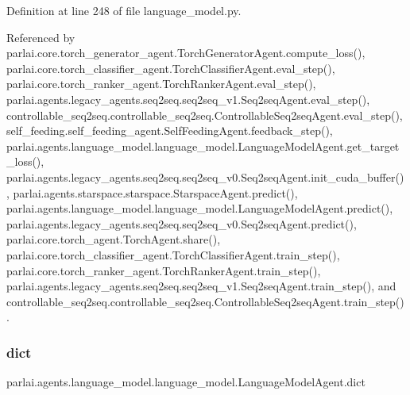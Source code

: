 Definition at line 248 of file language\+\_\+model.\+py.



Referenced by parlai.\+core.\+torch\+\_\+generator\+\_\+agent.\+Torch\+Generator\+Agent.\+compute\+\_\+loss(), parlai.\+core.\+torch\+\_\+classifier\+\_\+agent.\+Torch\+Classifier\+Agent.\+eval\+\_\+step(), parlai.\+core.\+torch\+\_\+ranker\+\_\+agent.\+Torch\+Ranker\+Agent.\+eval\+\_\+step(), parlai.\+agents.\+legacy\+\_\+agents.\+seq2seq.\+seq2seq\+\_\+v1.\+Seq2seq\+Agent.\+eval\+\_\+step(), controllable\+\_\+seq2seq.\+controllable\+\_\+seq2seq.\+Controllable\+Seq2seq\+Agent.\+eval\+\_\+step(), self\+\_\+feeding.\+self\+\_\+feeding\+\_\+agent.\+Self\+Feeding\+Agent.\+feedback\+\_\+step(), parlai.\+agents.\+language\+\_\+model.\+language\+\_\+model.\+Language\+Model\+Agent.\+get\+\_\+target\+\_\+loss(), parlai.\+agents.\+legacy\+\_\+agents.\+seq2seq.\+seq2seq\+\_\+v0.\+Seq2seq\+Agent.\+init\+\_\+cuda\+\_\+buffer(), parlai.\+agents.\+starspace.\+starspace.\+Starspace\+Agent.\+predict(), parlai.\+agents.\+language\+\_\+model.\+language\+\_\+model.\+Language\+Model\+Agent.\+predict(), parlai.\+agents.\+legacy\+\_\+agents.\+seq2seq.\+seq2seq\+\_\+v0.\+Seq2seq\+Agent.\+predict(), parlai.\+core.\+torch\+\_\+agent.\+Torch\+Agent.\+share(), parlai.\+core.\+torch\+\_\+classifier\+\_\+agent.\+Torch\+Classifier\+Agent.\+train\+\_\+step(), parlai.\+core.\+torch\+\_\+ranker\+\_\+agent.\+Torch\+Ranker\+Agent.\+train\+\_\+step(), parlai.\+agents.\+legacy\+\_\+agents.\+seq2seq.\+seq2seq\+\_\+v1.\+Seq2seq\+Agent.\+train\+\_\+step(), and controllable\+\_\+seq2seq.\+controllable\+\_\+seq2seq.\+Controllable\+Seq2seq\+Agent.\+train\+\_\+step().

\mbox{\label{classparlai_1_1agents_1_1language__model_1_1language__model_1_1LanguageModelAgent_abbb9c4e9bd984179a01f4bb0fa77a005}} 
\subsubsection{\texorpdfstring{dict}{dict}}
{\footnotesize\ttfamily parlai.\+agents.\+language\+\_\+model.\+language\+\_\+model.\+Language\+Model\+Agent.\+dict}



